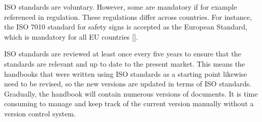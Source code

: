 ISO standards are voluntary. However, some are mandatory if for example referenced in regulation. These regulations differ across countries. For instance, the ISO 7010 standard for safety signs is accepted as the European Standard, which is mandatory for all EU countries [].

ISO standards are reviewed at least once every five years to ensure that the standards are relevant and up to date to the present market. This means the handbooks that were written using ISO standards as a starting point likewise need to be revised, so the new versions are updated in terms of ISO standards. Gradually, the handbook will contain numerous versions of documents. It is time consuming to manage and keep track of the current version manually without a version control system.


